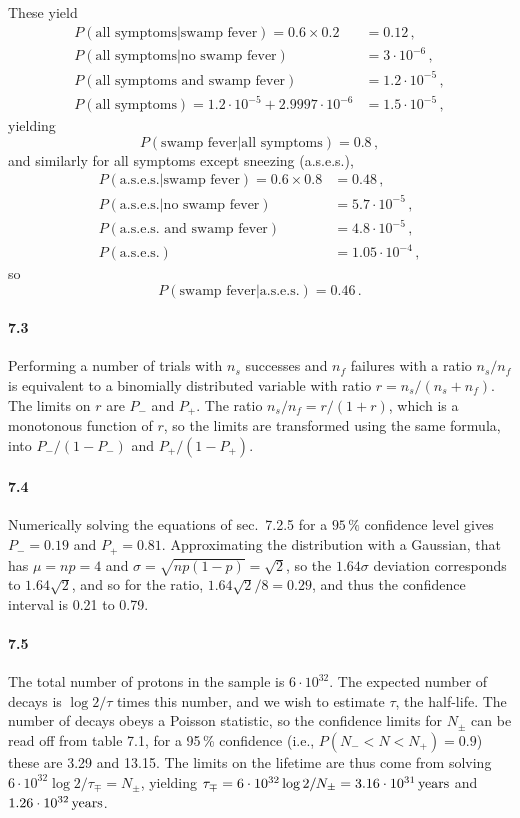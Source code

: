\documentclass[a4paper,12pt]{article}
\begin{document}
These yield
\[
 \begin{aligned}
  P(\text{all symptoms}|\text{swamp fever}) = 0.6\times 0.2 &= 0.12\,,\\
  P(\text{all symptoms}|\text{no swamp fever}) &= 3\cdot 10^{-6}\,,\\
  P(\text{all symptoms and swamp fever}) &= 1.2\cdot 10^{-5}\,,\\
  P(\text{all symptoms}) = 1.2\cdot 10^{-5} + 2.9997\cdot 10^{-6} &= 1.5 \cdot 10^{-5}\,,
 \end{aligned}
\]
yielding
\[
 P(\text{swamp fever}|\text{all symptoms}) = 0.8\,,
\]
and similarly for all symptoms except sneezing (a.s.e.s.),
\[
 \begin{aligned}
  P(\text{a.s.e.s.}|\text{swamp fever}) = 0.6\times 0.8 &= 0.48\,,\\
  P(\text{a.s.e.s.}|\text{no swamp fever}) &= 5.7\cdot10^{-5}\,,\\
  P(\text{a.s.e.s.\ and swamp fever}) &= 4.8\cdot 10^{-5}\,,\\
  P(\text{a.s.e.s.}) &= 1.05 \cdot 10^{-4}\,,
 \end{aligned}
\]
so
\[
 P(\text{swamp fever}|\text{a.s.e.s.}) = 0.46\,.
\]


\paragraph{7.3} Performing a number of trials with $n_s$ successes and $n_f$ failures with a ratio $n_s/n_f$ is equivalent to a binomially distributed variable with ratio $r=n_s/(n_s+n_f)$. The limits on $r$ are $P_-$ and $P_+$. The ratio $n_s/n_f=r/(1+r)$, which is a monotonous function of $r$, so the limits are transformed using the same formula, into $P_-/(1-P_-)$ and $P_+/(1-P_+)$.


\paragraph{7.4} Numerically solving the equations of sec.\ 7.2.5 for a $95\,\%$ confidence level gives $P_-=0.19$ and $P_+=0.81$. Approximating the distribution with a Gaussian, that has $\mu=np=4$ and $\sigma=\sqrt{np(1-p)} = \sqrt{2}$, so the $1.64\sigma$ deviation corresponds to $1.64\sqrt{2}$, and so for the ratio, $1.64\sqrt{2}/8=0.29$, and thus the confidence interval is 0.21 to 0.79.



\paragraph{7.5} The total number of protons in the sample is $6\cdot 10^{32}$. The expected number of decays is $\log 2 / \tau$ times this number, and we wish to estimate $\tau$, the half-life. The number of decays obeys a Poisson statistic, so the confidence limits for $N_{\pm}$ can be read off from table 7.1, for a 95\,\% confidence (i.e., $P(N_- < N < N_+) = 0.9$) these are 3.29 and 13.15. The limits on the lifetime are thus come from solving $6\cdot 10^{32}\log 2/\tau_{\mp} = N_{\pm}$, yielding $\tau_{\mp} = 6\cdot 10^{32}\log 2 /N_{\pm}=3.16\cdot 10^{31}\,{\rm years}$ and $1.26\cdot 10^{32}\,{\rm years}$.
\end{document}
